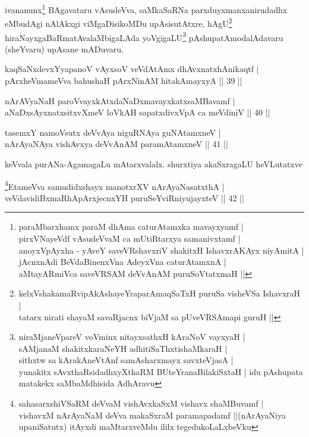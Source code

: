 \begin{artha}%
ivananunx\footnote{paraMbarxhamx paraM dhAma caturAtamxka mavayxyamf |\\
pirxVNayeVdf vAsudeVvaM ca mUtiRtarxya samanivxtamf |\\
anoyxVpAyxha - yAveY saveVRshavxriV shakitxH IshavxrAKAyx niyAmitA |\\
jAcnxnAdi BeVdaBinenxVna AdeyxVna caturAtamxnA |\\
aMtayARmiVca saveVRSAM deVvAnAM puruSoVtatxmaH ||} BAgavataru vAsudeVva, saMkaSaRNa parxduyxmanx\break anirudadhx eMbudAgi nAlAkxgi viMgaDisikoMDu upAsisutAtxre, hAgU\footnote{kelxVshakamaRvipAkAshayeYraparAmaqSaTxH puruSa visheVSa IshavxraH |\\tatarx nirati shayaM savaRjacnx biVjaM sa pUveVRSAmapi guruH ||} hiraNayxgaBaRmatAvalaMbigaLAda yoVgigaLU\footnote{niraMjaneVpareV voVminx nitayxsathxH kAraNoV vayxyaH |\\
sAMjanaM shakitxkaraNeYH adhitiSaThxtishaMkaraH |\\
sithxtw sa kArakAneVtAnf samAsharxmayx savxteVjasA | \\
yunakitx sAvxthaRsidadhxyXthaRM BUteYranaBilakiSxtaH | idu pAshupata matakekx saMbaMdhisida AdhAravu} pAshupatA\break modalAdavaru (sheYvaru) upAsane mADuvaru.
\end{artha}

\begin{shl}
kaqSaNxdevxYyapanoV vAyxsoV veVdAtAmx dhAvxnatxhAnikaqtf |\\
pArxheVmameVva bahushaH pArxNinAM hitakAmayxyA \hfill || 39 ||
\end{shl}

\begin{shl}
nArAVyaNaH paroV\s vayxkAtxdaNaDxmavayxkatxsaMBavamf |\\
aNaDxsAyxnatxsitxvXmeV loVkAH sapatxdivxVpA ca meVdiniV \hfill || 40 ||
\end{shl}

\begin{shl}
tasemxY namoV\s sutx deVvAya niguRNAya guNAtamxneV |\\
nArAyaNAya vishAvxya deVvAnAM paramAtamxneV \hfill || 41 ||
\end{shl}

\begin{artha}
keVvala purANa-AgamagaLu mAtarxvalalx. shurxtiya akaSxragaLU heVLutatxve
\end{artha}

\begin{shl}
\footnote{sahasarxshiVSaRM deVvaM vishAvxkaSxM vishavx shaMBuvamf |\\
vishavxM nArAyaNaM deVva makaSxraM paramapadamf ||(nArAyaNiya upaniSatutx) itAyxdi maMtarxveMdu ililx tegedukoLaLxbeVku}EtameVva samudidxshayx manotxrXV nArAyaNasatxthA |\\
veVdavidiBxmaRhApArxjecnxYH puruSeYviRniyujayxteV \hfill || 42 ||
\end{shl}

